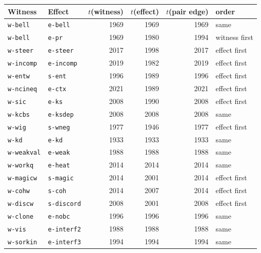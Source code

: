 \begin{tabular}{@{}llrrrl@{}}\toprule
Witness & Effect & $t$(witness) & $t$(effect) & $t$(pair edge) & order \\\midrule
\texttt{w-bell} & \texttt{e-bell} & 1969 & 1969 & 1969 & same \\
\texttt{w-bell} & \texttt{e-pr} & 1969 & 1980 & 1994 & witness first \\
\texttt{w-steer} & \texttt{e-steer} & 2017 & 1998 & 2017 & effect first \\
\texttt{w-incomp} & \texttt{e-incomp} & 2019 & 1982 & 2019 & effect first \\
\texttt{w-entw} & \texttt{s-ent} & 1996 & 1989 & 1996 & effect first \\
\texttt{w-ncineq} & \texttt{e-ctx} & 2021 & 1989 & 2021 & effect first \\
\texttt{w-sic} & \texttt{e-ks} & 2008 & 1990 & 2008 & effect first \\
\texttt{w-kcbs} & \texttt{e-ksdep} & 2008 & 2008 & 2008 & same \\
\texttt{w-wig} & \texttt{s-wneg} & 1977 & 1946 & 1977 & effect first \\
\texttt{w-kd} & \texttt{e-kd} & 1933 & 1933 & 1933 & same \\
\texttt{w-weakval} & \texttt{e-weak} & 1988 & 1988 & 1988 & same \\
\texttt{w-workq} & \texttt{e-heat} & 2014 & 2014 & 2014 & same \\
\texttt{w-magicw} & \texttt{s-magic} & 2014 & 2001 & 2014 & effect first \\
\texttt{w-cohw} & \texttt{s-coh} & 2014 & 2007 & 2014 & effect first \\
\texttt{w-discw} & \texttt{s-discord} & 2008 & 2001 & 2008 & effect first \\
\texttt{w-clone} & \texttt{e-nobc} & 1996 & 1996 & 1996 & same \\
\texttt{w-vis} & \texttt{e-interf2} & 1988 & 1988 & 1988 & same \\
\texttt{w-sorkin} & \texttt{e-interf3} & 1994 & 1994 & 1994 & same \\
\bottomrule\end{tabular}

